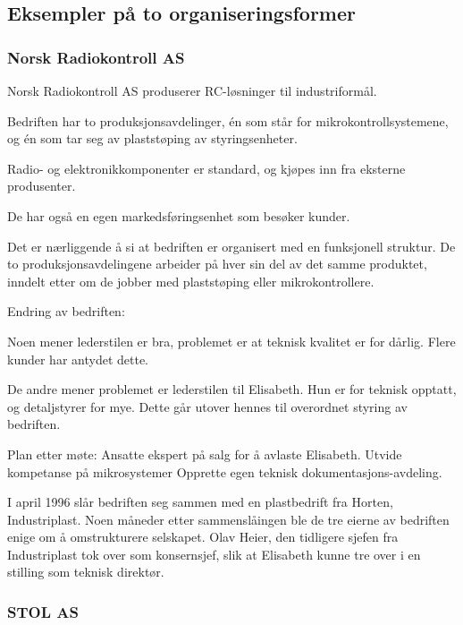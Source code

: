 
\subsection{Eksempler på to organiseringsformer}

\subsubsection{Norsk Radiokontroll AS}


Norsk Radiokontroll AS produserer RC-løsninger til industriformål.

Bedriften har to produksjonsavdelinger, én som står for mikrokontrollsystemene, og én som tar seg av plaststøping av styringsenheter.

Radio- og elektronikkomponenter er standard, og kjøpes inn fra eksterne produsenter.

De har også en egen markedsføringsenhet som besøker kunder.

Det er nærliggende å si at bedriften er organisert med en funksjonell struktur.
De to produksjonsavdelingene arbeider på hver sin del av det samme produktet, inndelt etter om de jobber med plaststøping eller mikrokontrollere.

Endring av bedriften:

Noen mener lederstilen er bra, problemet er at teknisk kvalitet er for dårlig.
Flere kunder har antydet dette.

De andre mener problemet er lederstilen til Elisabeth.
Hun er for teknisk opptatt, og detaljstyrer for mye.
Dette går utover hennes til overordnet styring av bedriften.

Plan etter møte:
Ansatte ekspert på salg for å avlaste Elisabeth.
Utvide kompetanse på mikrosystemer
Opprette egen teknisk dokumentasjons-avdeling.

I april 1996 slår bedriften seg sammen med en plastbedrift fra Horten, Industriplast.
Noen måneder etter sammenslåingen ble de tre eierne av bedriften enige om å omstrukturere selskapet. Olav Heier, den tidligere sjefen fra Industriplast tok over som konsernsjef, slik at Elisabeth kunne tre over i en stilling som teknisk direktør.


\subsubsection{STOL AS}

